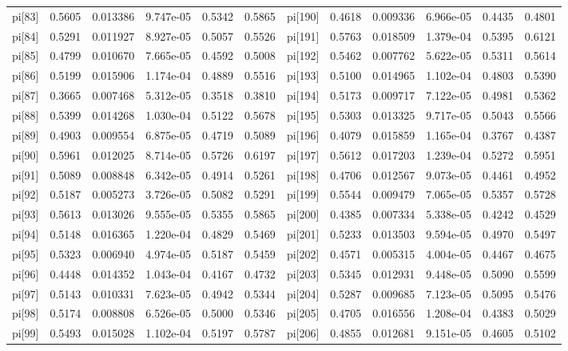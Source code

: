 \documentclass[12pt]{article}
\begin{document}
\begin{table}[h!]
\begin{tabular}{|llllll|llllll|}
pi[83]  & 0.5605 & 0.013386  & 9.747e-05 & 0.5342 &0.5865 &pi[190] & 0.4618 & 0.009336  & 6.966e-05 & 0.4435 &0.4801 \\
pi[84]  & 0.5291 & 0.011927  & 8.927e-05 & 0.5057 &0.5526 & pi[191] & 0.5763 & 0.018509  & 1.379e-04 & 0.5395 &0.6121 \\
pi[85]  & 0.4799 & 0.010670  & 7.665e-05 & 0.4592 &0.5008 &pi[192] & 0.5462 & 0.007762  & 5.622e-05 & 0.5311 &0.5614 \\
pi[86]  & 0.5199 & 0.015906  & 1.174e-04 & 0.4889 &0.5516 &pi[193] & 0.5100 & 0.014965  & 1.102e-04 & 0.4803 &0.5390 \\
pi[87]  & 0.3665 & 0.007468  & 5.312e-05 & 0.3518 &0.3810 &pi[194] & 0.5173 & 0.009717  & 7.122e-05 & 0.4981 &0.5362 \\
pi[88]  & 0.5399 & 0.014268  & 1.030e-04 & 0.5122 &0.5678 &pi[195] & 0.5303 & 0.013325  & 9.717e-05 & 0.5043 &0.5566 \\
pi[89]  & 0.4903 & 0.009554  & 6.875e-05 & 0.4719 &0.5089 &pi[196] & 0.4079 & 0.015859  & 1.165e-04 & 0.3767 &0.4387 \\
pi[90]  & 0.5961 & 0.012025  & 8.714e-05 & 0.5726 &0.6197 &pi[197] & 0.5612 & 0.017203  & 1.239e-04 & 0.5272 &0.5951 \\
pi[91]  & 0.5089 & 0.008848  & 6.342e-05 & 0.4914 &0.5261 &pi[198] & 0.4706 & 0.012567  & 9.073e-05 & 0.4461 &0.4952 \\
pi[92]  & 0.5187 & 0.005273  & 3.726e-05 & 0.5082 &0.5291 &pi[199] & 0.5544 & 0.009479  & 7.065e-05 & 0.5357 &0.5728 \\
pi[93]  & 0.5613 & 0.013026  & 9.555e-05 & 0.5355 &0.5865 &pi[200] & 0.4385 & 0.007334  & 5.338e-05 & 0.4242 &0.4529 \\
pi[94]  & 0.5148 & 0.016365  & 1.220e-04 & 0.4829 &0.5469 &pi[201] & 0.5233 & 0.013503  & 9.594e-05 & 0.4970 &0.5497 \\
pi[95]  & 0.5323 & 0.006940  & 4.974e-05 & 0.5187 &0.5459 &pi[202] & 0.4571 & 0.005315  & 4.004e-05 & 0.4467 &0.4675 \\
pi[96]  & 0.4448 & 0.014352  & 1.043e-04 & 0.4167 &0.4732 &pi[203] & 0.5345 & 0.012931  & 9.448e-05 & 0.5090 &0.5599 \\
pi[97]  & 0.5143 & 0.010331  & 7.623e-05 & 0.4942 &0.5344 &pi[204] & 0.5287 & 0.009685  & 7.123e-05 & 0.5095 &0.5476 \\
pi[98]  & 0.5174 & 0.008808  & 6.526e-05 & 0.5000 &0.5346 &pi[205] & 0.4705 & 0.016556  & 1.208e-04 & 0.4383 &0.5029 \\
pi[99]  & 0.5493 & 0.015028  & 1.102e-04 & 0.5197 &0.5787 &pi[206] & 0.4855 & 0.012681  & 9.151e-05 & 0.4605 &0.5102 \\

\end{tabular}
\end{table}
\end{document}
